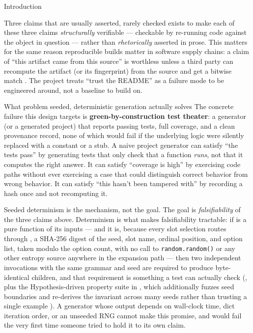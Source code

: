 \documentclass[
  ignorenonframetext,
]{beamer}
\begin{document}
\begin{frame}{Introduction}
\begin{block}{Three claims that are usually asserted, rarely checked}
 exists to make each of these three claims
\emph{structurally} verifiable --- checkable by re-running code against
the object in question --- rather than \emph{rhetorically} asserted in
prose. This matters for the same reason reproducible builds matter in
software supply chains: a claim of ``this artifact came from this
source'' is worthless unless a third party can recompute the artifact
(or its fingerprint) from the source and get a bitwise match
. The project treats ``trust the README'' as
a failure mode to be engineered around, not a baseline to build on.
\end{block}

\begin{block}{What problem seeded, deterministic generation actually
solves}
\protect{}\label{what-problem-seeded-deterministic-generation-actually-solves}
The concrete failure this design targets is
\textbf{green-by-construction test theater}: a generator (or a generated
project) that reports passing tests, full coverage, and a clean
provenance record, none of which would fail if the underlying logic were
silently replaced with a constant or a stub. A naive project generator
can satisfy ``the tests pass'' by generating tests that only check that
a function \emph{runs}, not that it computes the right answer. It can
satisfy ``coverage is high'' by exercising code paths without ever
exercising a case that could distinguish correct behavior from wrong
behavior. It can satisfy ``this hasn't been tampered with'' by recording
a hash once and not recomputing it.

Seeded determinism is the mechanism, not the goal. The goal is
\emph{falsifiability} of the three claims above. Determinism is what
makes falsifiability tractable: if  is a
pure function of its inputs --- and it is, because every slot selection
routes through
, a
SHA-256 digest of the seed, slot name, ordinal position, and option
list, taken modulo the option count, with no call to
\texttt{random.random()} or any other entropy source anywhere in the
expansion path --- then two independent invocations with the same
grammar and seed are required to produce byte-identical children, and
that requirement is something a test can actually check
(, plus the
Hypothesis-driven property suite in
, which additionally fuzzes seed
boundaries and re-derives the invariant across many seeds rather than
trusting a single example ). A generator whose output depends on
wall-clock time, dict iteration order, or an unseeded RNG cannot make
this promise, and would fail the very first time someone tried to hold
it to its own claim.


\end{block}
\end{frame}
\end{document}
